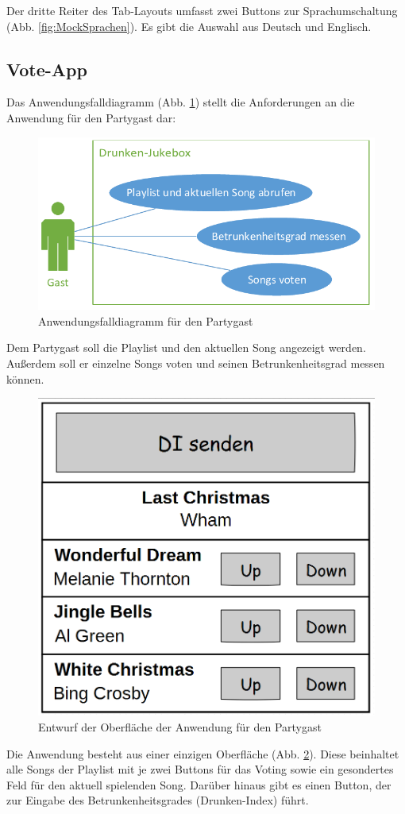 Der dritte Reiter des Tab-Layouts umfasst zwei Buttons zur Sprachumschaltung (Abb. \ref{fig:MockSprachen}). Es gibt die Auswahl aus Deutsch und Englisch.

\subsection{Vote-App}
Das Anwendungsfalldiagramm (Abb. \ref{fig:PartyPeopleUseCase}) stellt die Anforderungen an die Anwendung für den Partygast dar:

\begin{figure}[H]
\centering
\includegraphics[width=0.8\linewidth]{Bilder/PartyPeopleUseCase}
\caption{Anwendungsfalldiagramm für den Partygast}
\label{fig:PartyPeopleUseCase}
\end{figure}
Dem Partygast soll die Playlist und den aktuellen Song angezeigt werden. Außerdem soll er einzelne Songs voten und seinen Betrunkenheitsgrad messen können.

\begin{figure}[H]
\centering
\includegraphics[width=0.45\linewidth]{Bilder/MockPartyPeopleClient}
\caption{Entwurf der Oberfläche der Anwendung für den Partygast}
\label{fig:MockPartyPeopleClient}
\end{figure}

Die Anwendung besteht aus einer einzigen Oberfläche (Abb. \ref{fig:MockPartyPeopleClient}). Diese beinhaltet alle Songs der Playlist mit je zwei Buttons für das Voting sowie ein gesondertes Feld für den aktuell spielenden Song. Darüber hinaus gibt es einen Button, der zur Eingabe des Betrunkenheitsgrades (Drunken-Index) führt.

